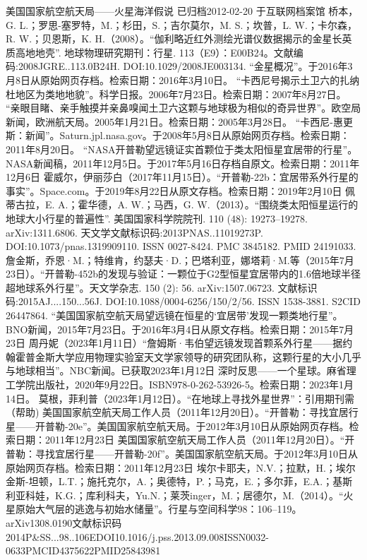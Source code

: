 \begin{enumerate}
 美国国家航空航天局——火星海洋假说 已归档2012-02-20 于互联网档案馆
 桥本，G. L.；罗思-塞罗特，M.；杉田，S.；吉尔莫尔，M. S.；坎普，L. W.；卡尔森，R. W.；贝恩斯，K. H.（2008）。“伽利略近红外测绘光谱仪数据揭示的金星长英质高地地壳”. 地球物理研究期刊：行星. 113（E9）：E00B24。文献编码:2008JGRE..113.0B24H. DOI:10.1029/2008JE003134.
 “金星概况”。于2016年3月8日从原始网页存档。检索日期：2016年3月10日。
 “卡西尼号揭示土卫六的扎纳杜地区为类地地貌”。科学日报。2006年7月23日。检索日期：2007年8月27日。
 “亲眼目睹、亲手触摸并亲鼻嗅闻土卫六这颗与地球极为相似的奇异世界”。欧空局新闻，欧洲航天局。2005年1月21日。检索日期：2005年3月28日。
 “卡西尼-惠更斯：新闻”。Saturn.jpl.nasa.gov。于2008年5月8日从原始网页存档。检索日期：2011年8月20日。
 “NASA开普勒望远镜证实首颗位于类太阳恒星宜居带的行星”。NASA新闻稿，2011年12月5日。于2017年5月16日存档自原文。检索日期：2011年12月6日
 霍威尔，伊丽莎白（2017年11月15日）。“开普勒-22b：宜居带系外行星的事实”。Space.com。于2019年8月22日从原文存档。检索日期：2019年2月10日
 佩蒂古拉，E. A.；霍华德，A. W.；马西，G. W.（2013）。“围绕类太阳恒星运行的地球大小行星的普遍性”. 美国国家科学院院刊. 110 (48): 19273–19278. arXiv:1311.6806. 天文学文献标识码:2013PNAS..11019273P. DOI:10.1073/pnas.1319909110. ISSN 0027-8424. PMC 3845182. PMID 24191033.
 詹金斯，乔恩·M.；特维肯，约瑟夫·D.；巴塔利亚，娜塔莉·M.等（2015年7月23日）。“开普勒-452b的发现与验证：一颗位于G2型恒星宜居带内的1.6倍地球半径超地球系外行星”。天文学杂志. 150 (2): 56. arXiv:1507.06723. 文献标识码:2015AJ....150...56J. DOI:10.1088/0004-6256/150/2/56. ISSN 1538-3881. S2CID 26447864.
 “美国国家航空航天局望远镜在恒星的‘宜居带’发现一颗类地行星”。BNO新闻，2015年7月23日。于2016年3月4日从原文存档。检索日期：2015年7月23日
 周丹妮（2023年1月11日）“詹姆斯·韦伯望远镜发现首颗系外行星——据约翰霍普金斯大学应用物理实验室天文学家领导的研究团队称，这颗行星的大小几乎与地球相当”。NBC新闻。已获取2023年1月12日
 深时反思——一个星球。麻省理工学院出版社，2020年9月22日。ISBN978-0-262-53926-5。检索日期：2023年1月14日。
 莫根，菲利普（2023年1月12日）。“在地球上寻找外星世界”：引用期刊需（帮助)
 美国国家航空航天局工作人员（2011年12月20日）。“开普勒：寻找宜居行星——开普勒-20e”。美国国家航空航天局。于2012年3月10日从原始网页存档。检索日期：2011年12月23日
 美国国家航空航天局工作人员（2011年12月20日）。“开普勒：寻找宜居行星——开普勒-20f”。美国国家航空航天局。于2012年3月10日从原始网页存档。检索日期：2011年12月23日
 埃尔卡耶夫，N.V.；拉默，H.；埃尔金斯-坦顿，L.T.；施托克尔，A.；奥德特，P.；马克，E.；多尔菲，E.A.；基斯利亚科娃，K.G.；库利科夫，Yu.N.；莱茨inger，M.；居德尔，M.（2014）。“火星原始大气层的逃逸与初始水储量”。行星与空间科学98：106–119。arXiv1308.0190文献标识码2014P&SS...98..106EDOI10.1016/j.pss.2013.09.008ISSN0032-0633PMCID4375622PMID25843981

\end{enumerate}

